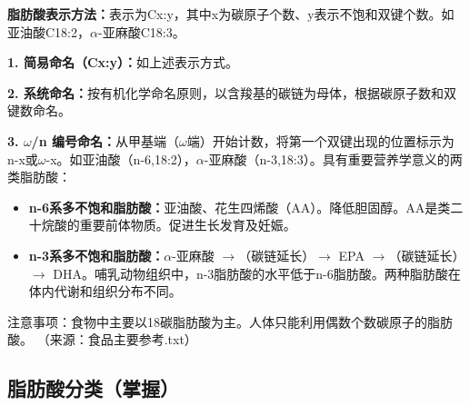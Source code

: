 \begin{tipbox}
\textbf{脂肪酸表示方法：}表示为Cx:y，其中x为碳原子个数、y表示不饱和双键个数。如亚油酸C18:2，$\alpha$-亚麻酸C18:3。

\textbf{1. 简易命名（Cx:y）：}如上述表示方式。

\textbf{2. 系统命名：}按有机化学命名原则，以含羧基的碳链为母体，根据碳原子数和双键数命名。

\textbf{3. $\omega$/n 编号命名：}从甲基端（$\omega$端）开始计数，将第一个双键出现的位置标示为n-x或$\omega$-x。如亚油酸（n-6,18:2），$\alpha$-亚麻酸（n-3,18:3）。具有重要营养学意义的两类脂肪酸：
\begin{itemize}[leftmargin=*]
    \item \textbf{n-6系多不饱和脂肪酸：}亚油酸、花生四烯酸（AA）。降低胆固醇。AA是类二十烷酸的重要前体物质。促进生长发育及妊娠。
    \item \textbf{n-3系多不饱和脂肪酸：}$\alpha$-亚麻酸 $\rightarrow$（碳链延长）$\rightarrow$ EPA $\rightarrow$（碳链延长）$\rightarrow$ DHA。哺乳动物组织中，n-3脂肪酸的水平低于n-6脂肪酸。两种脂肪酸在体内代谢和组织分布不同。
\end{itemize}
注意事项：食物中主要以18碳脂肪酸为主。人体只能利用偶数个数碳原子的脂肪酸。
（来源：食品主要参考.txt）
\end{tipbox}

\subsection{脂肪酸分类（掌握）}

